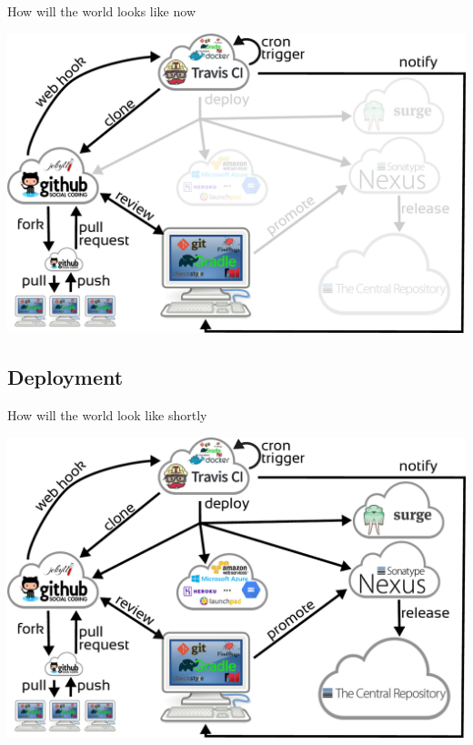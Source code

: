 \documentclass[presentation]{beamer}
\begin{document}
\begin{frame}[fragile]{How will the world looks like now}
	\begin{center}
		\includegraphics[width=.9\textwidth]{images/ci-travis}
	\end{center}
\end{frame}

\subsection{Deployment}

\begin{frame}[fragile]{How will the world look like shortly}
	\begin{center}
		\includegraphics[width=.9\textwidth]{images/ci}
	\end{center}
\end{frame}
\end{document}
